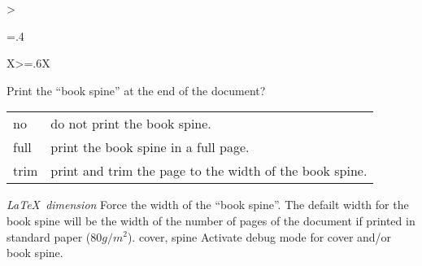 {\begin{xltabular}{\linewidth}{>{\hsize=.4\hsize\raggedright\arraybackslash}X>{\hsize=.6\hsize}X}
    {Print the “book spine” at the end of the document?}%
	{%
	    \begin{tabular}{@{}l@{ $\rightarrow$ }X@{}}
		no 		& do not print the book spine.\\
		full	& print the book spine in a full page.\\
		trim 	& print and trim the page to the width of the book spine.\\
	    \end{tabular}
    }
    \midrule
    {\emph{\LaTeX\ dimension}}%
    {Force the width of the “book spine”.}%
	{%
		 The defailt width for the book spine will be the width of the number of pages of the document if printed in standard paper ($80g/m^2$).
    }
    \midrule
    {cover, spine}%
    {Activate debug mode for cover and/or book spine.}%
	{%
    }
%
%
%
%

\end{xltabular}}
